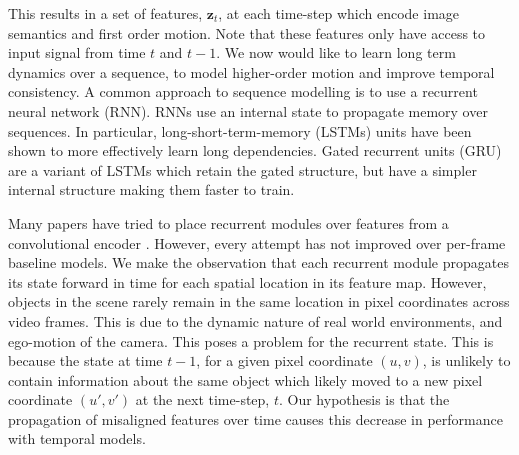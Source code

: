 This results in a set of features, $\mathbf{z}_t$, at each time-step which encode image semantics and first order motion. Note that these features only have access to input signal from time $t$ and $t-1$. We now would like to learn long term dynamics over a sequence, to model higher-order motion and improve temporal consistency. A common approach to sequence modelling is to use a recurrent neural network (RNN). RNNs use an internal state to propagate memory over sequences. In particular, long-short-term-memory (LSTMs) units \citep{hochreiter1997long} have been shown to more effectively learn long dependencies. Gated recurrent units (GRU) \citep{cho2014learning} are a variant of LSTMs which retain the gated structure, but have a simpler internal structure making them faster to train.

Many papers have tried to place recurrent modules over features from a convolutional encoder \citep{patraucean2015spatio,valipour2017recurrent}. However, every attempt has not improved over per-frame baseline models. We make the observation that each recurrent module propagates its state forward in time for each spatial location in its feature map. However, objects in the scene rarely remain in the same location in pixel coordinates across video frames. This is due to the dynamic nature of real world environments, and ego-motion of the camera. This poses a problem for the recurrent state. This is because the state at time $t-1$, for a given pixel coordinate $(u,v)$, is unlikely to contain information about the same object which likely moved to a new pixel coordinate $(u',v')$ at the next time-step, $t$. Our hypothesis is that the propagation of misaligned features over time causes this decrease in performance with temporal models.

